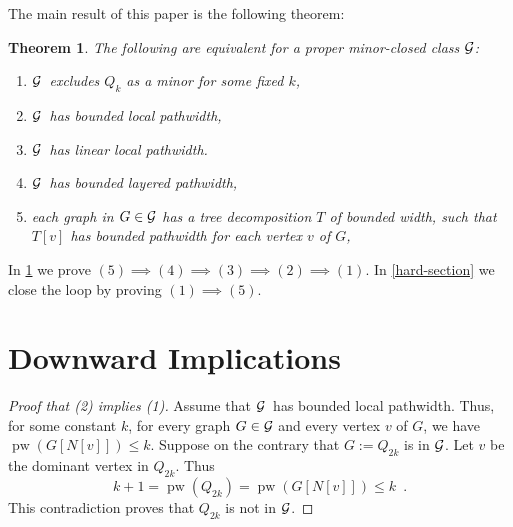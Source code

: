\documentclass[a4paper,11pt]{article}
\newcommand{\GG}{\ensuremath{\protect{\mathcal{G}}}}
\DeclareMathOperator{\pw}{pw}
\theoremstyle{plain}
\newtheorem{theorem}{Theorem}
\theoremstyle{definition}
\begin{document}
The main result of this paper is the following theorem:

\begin{theorem}
\label{MainThm}
The following are equivalent for a proper minor-closed class \GG:
\begin{enumerate}[(1)]
\item \GG\ excludes $Q_k$ as a minor for some fixed $k$,
\item \GG\ has bounded local pathwidth,
\item \GG\ has linear local pathwidth.
\item \GG\ has bounded layered pathwidth,
\item each graph in $G\in\GG$ has a tree decomposition $T$ of bounded width, such that $T[v]$ has bounded pathwidth for each vertex $v$ of $G$,
\end{enumerate}
\end{theorem}

In \cref{easy-section} we prove $(5)\implies (4)\implies(3)\implies(2)\implies(1)$. In \cref{hard-section} we close the loop by proving $(1)\implies (5)$.

\section{Downward Implications}
\label{easy-section}

%

\begin{proof}[Proof that (2) implies (1)] Assume that \GG\ has bounded local pathwidth. Thus, for some constant $k$, for every graph $G\in\GG$ and every vertex $v$ of $G$, we have $\pw(G[N[v]])\leq k$. Suppose on the contrary that $G:=Q_{2k}$ is in \GG. Let $v$ be the dominant vertex in $Q_{2k}$. Thus $$k+1=\pw(Q_{2k})=\pw(G[N[v]])\leq k\enspace.$$ This contradiction proves that $Q_{2k}$ is not in \GG. 
\end{proof}
\end{document}
